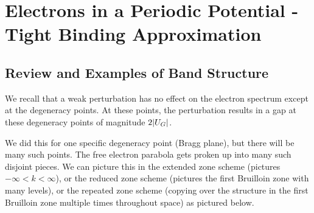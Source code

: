 \section{Electrons in a Periodic Potential - Tight Binding Approximation}
\subsection{Review and Examples of Band Structure}
We recall that a weak perturbation has no effect on the electron spectrum except at the degeneracy points. At these points, the perturbation results in a gap at these degeneracy points of magnitude $2\lvert U_G \rvert$. 

We did this for one specific degeneracy point (Bragg plane), but there will be many such points. The free electron parabola gets proken up into many such disjoint pieces. We can picture this in the extended zone scheme (pictures $-\infty < k < \infty$), or the reduced zone scheme (pictures the first Bruilloin zone with many levels), or the repeated zone scheme (copying over the structure in the first Bruilloin zone multiple times throughout space) as pictured below.

